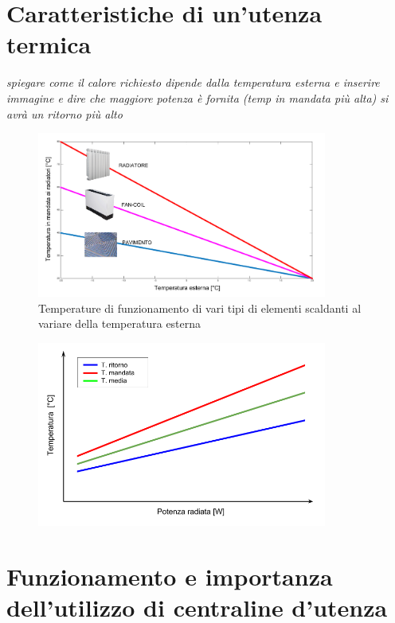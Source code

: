 \documentclass[laurea,oneside,11pt]{USiena_tesiLM}
\begin{document}
\section{Caratteristiche di un'utenza termica}

\textit{spiegare come il calore richiesto dipende dalla temperatura esterna e inserire immagine e dire che maggiore potenza è fornita (temp in mandata più alta) si avrà un ritorno più alto}

\begin{figure}[!ht]
\centering
\includegraphics[width=0.85\textwidth]{figure/elem_scaldanti} 
\caption{Temperature di funzionamento di vari tipi di elementi scaldanti al variare della temperatura esterna}
\label{fig:elem_scaldanti}
\end{figure}

\begin{figure}[!ht]
\centering
\includegraphics[width=0.85\textwidth]{figure/pot_radiatore} 
\caption{}
\label{fig:pot_radiatore}
\end{figure}

\section{Funzionamento e importanza dell'utilizzo di centraline d'utenza}
\end{document}
